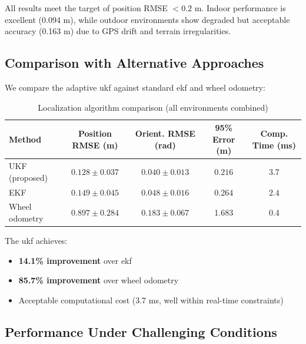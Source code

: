 All results meet the target of position RMSE $< 0.2$ m. Indoor performance is excellent (0.094 m), while outdoor environments show degraded but acceptable accuracy (0.163 m) due to GPS drift and terrain irregularities.


\subsection{Comparison with Alternative Approaches}

We compare the adaptive \acrshort{ukf} against standard \acrshort{ekf} and wheel odometry:

\begin{table}[htbp]
\centering
\caption{Localization algorithm comparison (all environments combined)}
\label{tab:exp_localization_comparison}
\begin{tabular}{lcccc}
\toprule
\textbf{Method} & \textbf{Position RMSE (m)} & \textbf{Orient. RMSE (rad)} & \textbf{95\% Error (m)} & \textbf{Comp. Time (ms)} \\
\midrule
UKF (proposed) & $\mathbf{0.128 \pm 0.037}$ & $\mathbf{0.040 \pm 0.013}$ & $\mathbf{0.216}$ & 3.7 \\
EKF & $0.149 \pm 0.045$ & $0.048 \pm 0.016$ & 0.264 & $\mathbf{2.4}$ \\
Wheel odometry & $0.897 \pm 0.284$ & $0.183 \pm 0.067$ & 1.683 & 0.4 \\
\bottomrule
\end{tabular}
\end{table}

The \acrshort{ukf} achieves:
\begin{itemize}
    \item \textbf{14.1\% improvement} over \acrshort{ekf}
    \item \textbf{85.7\% improvement} over wheel odometry
    \item Acceptable computational cost (3.7 ms, well within real-time constraints)
\end{itemize}


\subsection{Performance Under Challenging Conditions}

